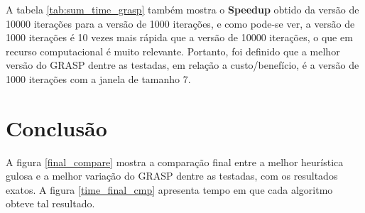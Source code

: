 \documentclass[a4paper, 12pt]{article}
\begin{document}
\begin{table}[htbp]
    \centering
\end{table}

A tabela \ref{tab:sum_time_grasp} também mostra o \textbf{Speedup} obtido da versão de 10000 iterações para
a versão de 1000 iterações, e como pode-se ver, a versão de 1000 iterações é 10 vezes mais rápida que a versão
de 10000 iterações, o que em recurso computacional é muito relevante.
Portanto, foi definido que a melhor versão do GRASP dentre as testadas, em relação a custo/benefício,
é a versão de 1000 iterações com a janela de tamanho 7.



\section{Conclusão}

A figura \ref{final_compare} mostra a comparação final entre a melhor heurística gulosa e a melhor variação do GRASP
dentre as testadas, com os resultados exatos. A figura \ref{time_final_cmp} apresenta tempo em que cada
algoritmo obteve tal resultado.
\end{document}
